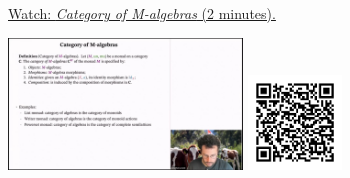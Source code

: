 
\begin{minipage}{10cm}
    \href{https://act4e-spring21.netlify.app/videos/spring2021-monads-b:cat-algebras.html}{Watch: \emph{Category of M-algebras} (2 minutes).}
        
    \href{https://act4e-spring21.netlify.app/videos/spring2021-monads-b:cat-algebras.html}{\includegraphics[height=3.5cm]{spring2021-monads-b:cat-algebras/thumbnails.jpg}}
    \href{https://act4e-spring21.netlify.app/videos/spring2021-monads-b:cat-algebras.html}{\includegraphics[height=2.5cm]{spring2021-monads-b:cat-algebras/qrcode.png}}
\end{minipage}
